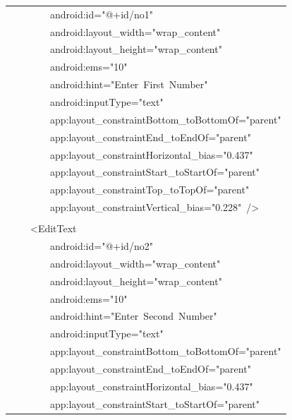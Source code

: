 \documentclass[a4paper,12pt]{article}
\begin{document}
\begin{longtable}{|p{}|}
{\ttfamily\small \ \ \ \ \ \ \ \ android:id="@+id/no1"} \\
{\ttfamily\small \ \ \ \ \ \ \ \ android:layout\_width="wrap\_content"} \\
{\ttfamily\small \ \ \ \ \ \ \ \ android:layout\_height="wrap\_content"} \\
{\ttfamily\small \ \ \ \ \ \ \ \ android:ems="10"} \\
{\ttfamily\small \ \ \ \ \ \ \ \ android:hint="Enter\ First\ Number"} \\
{\ttfamily\small \ \ \ \ \ \ \ \ android:inputType="text"} \\
{\ttfamily\small \ \ \ \ \ \ \ \ app:layout\_constraintBottom\_toBottomOf="parent"} \\
{\ttfamily\small \ \ \ \ \ \ \ \ app:layout\_constraintEnd\_toEndOf="parent"} \\
{\ttfamily\small \ \ \ \ \ \ \ \ app:layout\_constraintHorizontal\_bias="0.437"} \\
{\ttfamily\small \ \ \ \ \ \ \ \ app:layout\_constraintStart\_toStartOf="parent"} \\
{\ttfamily\small \ \ \ \ \ \ \ \ app:layout\_constraintTop\_toTopOf="parent"} \\
{\ttfamily\small \ \ \ \ \ \ \ \ app:layout\_constraintVertical\_bias="0.228"\ /\textgreater{}} \\
\strut \\
{\ttfamily\small \ \ \ \ \textless{}EditText} \\
{\ttfamily\small \ \ \ \ \ \ \ \ android:id="@+id/no2"} \\
{\ttfamily\small \ \ \ \ \ \ \ \ android:layout\_width="wrap\_content"} \\
{\ttfamily\small \ \ \ \ \ \ \ \ android:layout\_height="wrap\_content"} \\
{\ttfamily\small \ \ \ \ \ \ \ \ android:ems="10"} \\
{\ttfamily\small \ \ \ \ \ \ \ \ android:hint="Enter\ Second\ Number"} \\
{\ttfamily\small \ \ \ \ \ \ \ \ android:inputType="text"} \\
{\ttfamily\small \ \ \ \ \ \ \ \ app:layout\_constraintBottom\_toBottomOf="parent"} \\
{\ttfamily\small \ \ \ \ \ \ \ \ app:layout\_constraintEnd\_toEndOf="parent"} \\
{\ttfamily\small \ \ \ \ \ \ \ \ app:layout\_constraintHorizontal\_bias="0.437"} \\
{\ttfamily\small \ \ \ \ \ \ \ \ app:layout\_constraintStart\_toStartOf="parent"} \\

\end{longtable}
\end{document}
